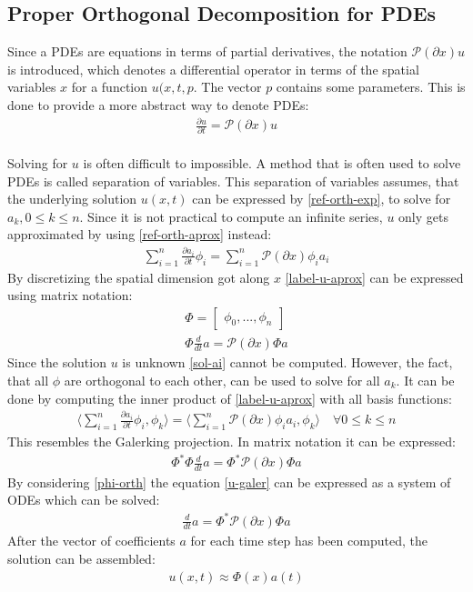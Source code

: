 \subsection{Proper Orthogonal Decomposition for PDEs}
Since a PDEs are equations in terms of partial derivatives, the notation \(\mathscr{P}(\partial x) u\) is introduced, which denotes a differential operator in terms of the spatial variables \(x\) for a function \(u(x,t,p\).
The vector \(p\) contains some parameters.
This is done to provide a more abstract way to denote PDEs:
\begin{gather}
\frac{\partial u}{\partial t} = \mathscr{P}(\partial x) u
\end{gather}
\cite{Gustafsson2011f} \\
Solving for \(u\) is often difficult to impossible.
A method that is often used to solve PDEs is called separation of variables.
This separation of variables assumes, that the underlying solution \(u(x, t)\) can be expressed by \ref{ref-orth-exp}, to solve for \(a_k, 0 \leq k \leq n\).
Since it is not practical to compute an infinite series, \(u\) only gets approximated by using \ref{ref-orth-aprox} instead:
\begin{gather}
\sum_{i = 1} ^{n} \frac{\partial a_i}{\partial t} \phi_i = \sum_{i = 1} ^{n} \mathscr{P}(\partial x) \phi_i a_i \label{label-u-aprox} 
\end{gather}
By discretizing the spatial dimension got along \(x\) \ref{label-u-aprox} can be expressed using matrix notation:
\begin{gather}
\Phi = \begin{bmatrix}
\phi_0, ..., \phi_n
\end{bmatrix} \label{mat-phi}\\
\Phi \frac{d}{dt}a = \mathscr{P}(\partial x) \Phi a
\end{gather}
Since the solution \(u\) is unknown \ref{sol-ai} cannot be computed.
However, the fact, that all \(\phi\) are orthogonal to each other, can be used to solve for all \(a_k\).
It can be done by computing the inner product of \ref{label-u-aprox} with all basis functions:
\begin{gather}
\langle \sum_{i = 1} ^{n} \frac{\partial a_i}{\partial t} \phi_i, \phi_k \rangle = \langle\sum_{i = 1} ^{n} \mathscr{P}(\partial x) \phi_i a_i, \phi_k \rangle \quad \forall 0 \leq k \leq n \label{u-galer}
\end{gather}
This resembles the Galerking projection.
In matrix notation it can be expressed:
\begin{gather}
\Phi^{*}\Phi \frac{d}{dt}a = \Phi^{*}\mathscr{P}(\partial x) \Phi a
\end{gather}
By considering \ref{phi-orth}  the equation \ref{u-galer} can be expressed as a system of ODEs which can be solved:
\begin{gather}
\frac{d}{dt} a = \Phi^{*}\mathscr{P}(\partial x) \Phi a
\end{gather}
After the vector of coefficients \(a\) for each time step has been computed, the solution can be assembled:
\begin{gather}
u(x, t) \approx \Phi(x)a(t) \label{u-aprox-pod}
\end{gather} 
\cite{brunton_kutz_2019c}
